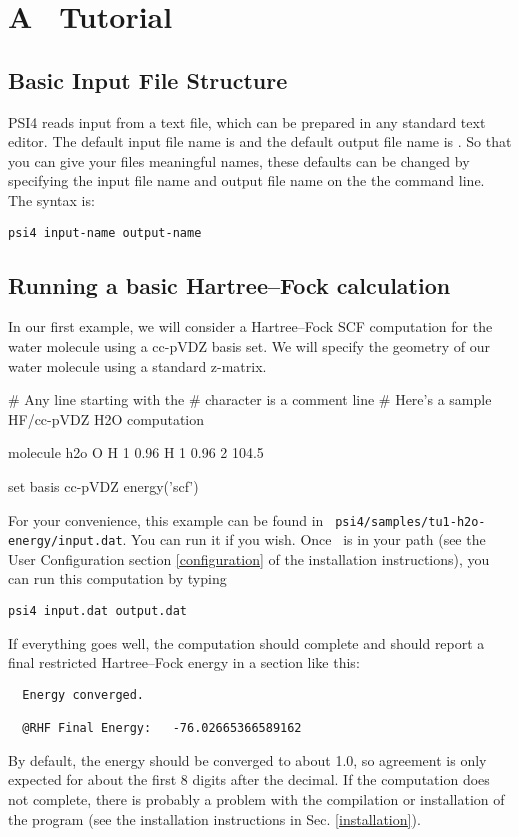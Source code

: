\section{A \PSIfour\ Tutorial} \label{tutorial}

\subsection{Basic Input File Structure} 

PSI4 reads input from a text file, which can be prepared in any standard
text editor.  The default input file name is  and the
default output file name is .  So that you can give your
files meaningful names, these defaults can be changed by specifying
the input file name and output file name on the the command line.
The syntax is:

{\tt psi4 input-name output-name}

\subsection{Running a basic Hartree--Fock calculation}
In our first example, we will consider a Hartree--Fock SCF computation
for the water molecule using a cc-pVDZ basis set.  We will specify the
geometry of our water molecule using a standard z-matrix.

\begin{Snippet}

# Any line starting with the # character is a comment line
# Here's a sample HF/cc-pVDZ H2O computation

molecule h2o {
  O 
  H 1 0.96
  H 1 0.96 2 104.5
}

set basis cc-pVDZ
energy('scf')
\end{Snippet}

For your convenience, this example can be found in {\tt
psi4/samples/tu1-h2o-energy/input.dat}.  You can run it if you wish.
Once \PSIfour\ is in your path (see the User Configuration section \ref{configuration} of the
installation instructions), you can run this computation by typing
\begin{verbatim}
psi4 input.dat output.dat
\end{verbatim}
If everything goes well, the computation should complete and should report
a final restricted Hartree--Fock energy in a section like this:
\begin{verbatim}
  Energy converged.

  @RHF Final Energy:   -76.02665366589162
\end{verbatim}
By default, the energy should be converged to about 1.0, so agreement
is only expected for about the first 8 digits after the decimal.  If the
computation does not complete, there is probably a problem with the
compilation or installation of the program (see the installation
instructions in Sec. \ref{installation}).

